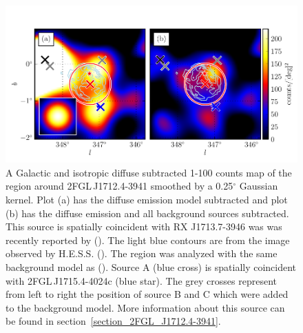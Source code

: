 \documentclass[12pt,preprint]{aastex}
\newcommand{\gev}{\text{GeV}\xspace}
\newcommand{\tev}{\text{TeV}\xspace}
\renewcommand{\deg}{\ensuremath{^\circ}\xspace}
\begin{document}
\begin{figure}
  \begin{center}
    \includegraphics[type=pdf,ext=.pdf,read=.pdf]{source_plots/source_RX_J1713.7-3946}
  \end{center}
  \caption{A Galactic and isotropic diffuse subtracted 1-100 \gev
  counts map of the region around 2FGL\,J1712.4-3941 smoothed by
  a 0.25\deg Gaussian kernel.  Plot (a) has the diffuse emission
  model subtracted and plot (b) has the diffuse emission and all
  background sources subtracted.  This source is spatially
  coincident with RX J1713.7-3946 was was recently reported by
  (\cite{rx_j1713_lat}).  The light blue contours are from the \tev image
  observed by H.E.S.S. (\cite{rx_j1713_hess}).  The region was analyzed
  with the same background model as (\cite{rx_j1713_lat}).  Source A (blue
  cross) is spatially coincident with 2FGL\,J1715.4-4024c (blue star).
  The grey crosses represent from left to right the position of source B
  and C which were added to the background model. More information about
  this source can be found in section~\ref{section_2FGL_J1712.4-3941}.
  }\label{2FGL_J1712.4-3941}
\end{figure}
\end{document}
